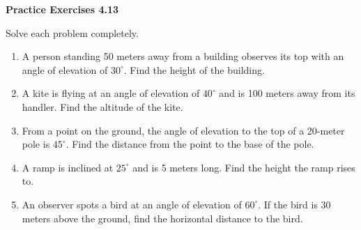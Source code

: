 \vspace{0.3ex}
\noindent\textbf{Practice Exercises 4.13}

\vspace{0.2ex}

Solve each problem completely.

\begin{enumerate}
    \item A person standing 50 meters away from a building observes its top with an angle of elevation of \(30^\circ\). Find the height of the building.
    \item A kite is flying at an angle of elevation of \(40^\circ\) and is 100 meters away from its handler. Find the altitude of the kite.
    \item From a point on the ground, the angle of elevation to the top of a 20-meter pole is \(45^\circ\). Find the distance from the point to the base of the pole.
    \item A ramp is inclined at \(25^\circ\) and is 5 meters long. Find the height the ramp rises to.
    \item An observer spots a bird at an angle of elevation of \(60^\circ\). If the bird is 30 meters above the ground, find the horizontal distance to the bird.
\end{enumerate}

